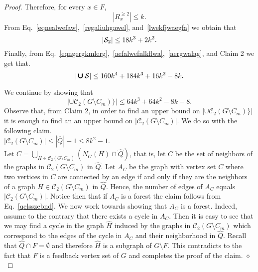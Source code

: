 \documentclass[a4paper,11pt]{article}
\newcommand{\cc}{{\mathcal{C}}}
\newcommand{\cupall}{\pmb{\pmb{\cup}}}
\begin{document}
\begin{proof}
Therefore, for every $x\in F$,
\begin{equation}\label{lwekfjwaegfa}
|R_{x}^{\geq 2}|\leq k.
\end{equation}
From Eq.~\eqref{eqnealwefaw},~\eqref{regaliuhgawel}, and~\eqref{lwekfjwaegfa} we obtain that
\begin{equation}\label{aergwalag}
|{\cal S}_{2}|\leq 18k^{3}+2k^{2}.
\end{equation}
Finally, from Eq.~\eqref{eqngergkmlerg},~\eqref{aefalwefnlkflwa},~\eqref{aergwalag}, and Claim 2 we get that.
\begin{equation}\label{rstsze}
|\cupall {\cal S}| \leq 160k^{4} + 184k^{3} + 16k^{2} - 8k.
\end{equation}


\noindent We continue by showing that 
\begin{equation}\label{cc2szebnd}
\left|\cupall \cc_{2}(G\setminus C_{m})\}\right|\leq 64k^{3}+64k^{2}-8k-8.
\end{equation}
\noindent Observe that, from Claim 2, in order to find an upper bound on $\left|\cupall \cc_{2}(G\setminus C_{m})\}\right|$ it is enough to 
find an an upper bound on $|\cc_{2}(G\setminus C_{m})|$.
We do so with the following claim.\\

 $|\cc_{2}(G\setminus C_{m})|\leq |\widehat{Q}|-1\leq 8k^{2}-1$.\\


 Let $\displaystyle C=\bigcup_{H\in \cc_{2}(G\setminus C_{m})} (N_{G}(H)\cap \widehat{Q})$, 
that is, let $C$ be the set of neighbors of the graphs in $\cc_{2}(G\setminus C_{m})$ in $\widehat{Q}$.
Let $A_{C}$ be the graph with vertex set $C$ where two vertices in $C$ are connected by an edge if and only if they are the neighbors of
a graph $H\in \cc_{2}(G\setminus C_{m})$ in $\widehat{Q}$. Hence, the number of edges of $A_{C}$ equals $|\cc_{2}(G\setminus C_{m})|$.
Notice then that if $A_{C}$ is a forest the claim follows from Eq.~\eqref{qclsszebnd}.
We now work towards showing that $A_{C}$ is a forest. Indeed, assume to the contrary that there exists a cycle in $A_{C}$. 
Then it is easy to see that we may find a cycle
in the graph $\widehat{H}$ induced by the graphs in $\cc_{2}(G\setminus C_{m})$ which correspond to the edges of the cycle in $A_{C}$
and their neighborhood in $\widehat{Q}$.
Recall that $\widehat{Q}\cap F=\emptyset$ and therefore $\widehat{H}$ is a subgraph of $G\setminus F$.
This contradicts to the fact that $F$ is a feedback vertex set of $G$ and completes the proof of the claim.
\hfill $\diamond$\\



\end{proof}
\end{document}
